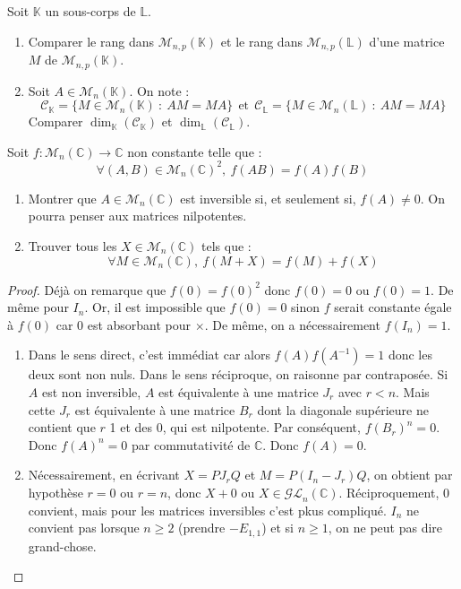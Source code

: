 \documentclass[french,a4paper]{article}
\newcommand{\C}{\mathbb{C}}
\newcommand{\K}{\mathbb{K}}
\renewcommand{\L}{\mathbb{L}}
\newcommand{\inv}{^{-1}}
\theoremstyle{plain}
\theoremstyle{definition}
\theoremstyle{remark}
\begin{document}
\begin{ex}{}
	Soit $\K$ un sous-corps de $\L$.
	\begin{enumerate}
		\item Comparer le rang dans $\mathcal{M}_{n,p}(\K)$ et le rang dans $\mathcal{M}_{n,p}(\L)$ d'une matrice $M$ de $\mathcal{M}_{n,p}(\K)$.
		\item Soit $A\in\mathcal{M}_n(\K)$. On note : $$\mathcal{C}_\K=\{M\in\mathcal{M}_n(\K)\ : \ AM=MA\}\ \ \text{et}\ \ \mathcal{C}_\L=\{M\in\mathcal{M}_n(\L)\ : \ AM=MA\}$$ Comparer $\dim_\K(\mathcal{C}_\K)$ et $\dim_\L(\mathcal{C}_\L)$.
	\end{enumerate}
\end{ex}

\begin{ex}{}
	Soit $f:\mathcal{M}_n(\C)\to\C$ non constante telle que : $$\forall(A,B)\in\mathcal{M}_n(\C)^2,\ f(AB)=f(A)f(B)$$
	\begin{enumerate}
		\item Montrer que $A\in\mathcal{M}_n(\C)$ est inversible si, et seulement si, $f(A)\ne 0$. On pourra penser aux matrices nilpotentes.
		\item Trouver tous les $X\in\mathcal{M}_n(\C)$ tels que : $$\forall M\in\mathcal{M}_n(\C),\ f(M+X)=f(M)+f(X)$$
	\end{enumerate}
\end{ex}
\begin{proof}
	Déjà on remarque que $f(0)=f(0)^2$ donc $f(0)=0$ ou $f(0)=1$. De même pour $I_n$. Or, il est impossible que $f(0)=0$ sinon $f$ serait constante égale à $f(0)$ car $0$ est absorbant pour $\times$. De même, on a nécessairement $f(I_n)=1$.
	\begin{enumerate}
		\item Dans le sens direct, c'est immédiat car alors $f(A)f(A\inv)=1$ donc les deux sont non nuls. Dans le sens réciproque, on raisonne par contraposée. Si $A$ est non inversible, $A$ est équivalente à une matrice $J_r$ avec $r<n$. Mais cette $J_r$ est équivalente à une matrice $B_r$  dont la diagonale supérieure ne contient que $r$ 1 et des 0, qui est nilpotente. Par conséquent, $f(B_r)^n=0$. Donc $f(A)^n=0$ par commutativité de $\C$. Donc $f(A)=0$.
		\item Nécessairement, en écrivant $X=PJ_rQ$ et $M=P(I_n-J_r)Q$, on obtient par hypothèse $r=0$ ou $r=n$, donc $X+0$ ou $X\in\mathcal{GL}_n(\C)$. Réciproquement, $0$ convient, mais pour les matrices inversibles c'est pkus compliqué. $I_n$ ne convient pas lorsque $n\geqslant2$ (prendre $-E_{1,1}$) et si $n\geqslant 1$, on ne peut pas dire grand-chose.
	\end{enumerate}
\end{proof}
\end{document}

